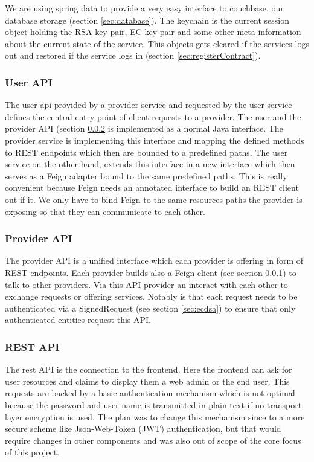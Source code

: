 We are using spring data to provide a very easy interface to couchbase, our database storage (section \ref{sec:database}). The keychain is the current session object holding the RSA key-pair, EC key-pair and some other meta information about the current state of the service. This objects gets cleared if the services logs out and restored if the service logs in (section \ref{sec:registerContract}). 

\subsubsection{User API}
\label{sec:userAPI}
The user api provided by a provider service and requested by the user service defines the central entry point of client requests to a provider. The user and the provider API (section \ref{sec:providerAPI} is implemented as a normal Java interface. The provider service is implementing this interface and mapping the defined methods to REST endpoints which then are bounded to a predefined paths. The user service on the other hand, extends this interface in a new interface which then serves as a Feign adapter bound to the same predefined paths. This is really convenient because Feign needs an annotated interface to build an REST client out if it. We only have to bind Feign to the same resources paths the provider is exposing so that they can communicate to each other. 

\subsubsection{Provider API}
\label{sec:providerAPI}
The provider API is a unified interface which each provider is offering in form of REST endpoints. Each provider builds also a Feign client (see section \ref{sec:userAPI}) to talk to other providers.  Via this API provider an interact with each other to exchange requests or offering services. Notably is that each request needs to be authenticated via a SignedRequest (see section \ref{sec:ecdsa}) to ensure that only authenticated entities request this API. 

\subsubsection{REST API}
The rest API is the connection to the frontend. Here the frontend can ask for user resources and claims to display them a web admin or the end user. This requests are backed by a basic authentication mechanism which is not optimal because the password and user name is transmitted in plain text if no transport layer encryption is used. The plan was to change this mechanism since to a more secure scheme like Json-Web-Token (JWT) authentication, but that would require changes in other components and was also out of scope of the core focus of this project. 

